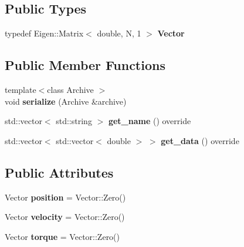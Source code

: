 \subsection*{Public Types}
\begin{DoxyCompactItemize}
\item 
\mbox{\label{structrobot__interfaces_1_1NJointObservation_aa17734049f437f1f2a7fee0009ff91fe}} 
typedef Eigen\+::\+Matrix$<$ double, N, 1 $>$ {\bfseries Vector}
\end{DoxyCompactItemize}
\subsection*{Public Member Functions}
\begin{DoxyCompactItemize}
\item 
\mbox{\label{structrobot__interfaces_1_1NJointObservation_a0c3b4adc3922ac32f11ba5de22d60625}} 
{\footnotesize template$<$class Archive $>$ }\\void {\bfseries serialize} (Archive \&archive)
\item 
\mbox{\label{structrobot__interfaces_1_1NJointObservation_a610b88db60db090f64a03d4a286332be}} 
std\+::vector$<$ std\+::string $>$ {\bfseries get\+\_\+name} () override
\item 
\mbox{\label{structrobot__interfaces_1_1NJointObservation_a5294b6b4e403b79f199dff888984bbf1}} 
std\+::vector$<$ std\+::vector$<$ double $>$ $>$ {\bfseries get\+\_\+data} () override
\end{DoxyCompactItemize}
\subsection*{Public Attributes}
\begin{DoxyCompactItemize}
\item 
\mbox{\label{structrobot__interfaces_1_1NJointObservation_ab7b9151ce91a3b545364cab6163ba86f}} 
Vector {\bfseries position} = Vector\+::\+Zero()
\item 
\mbox{\label{structrobot__interfaces_1_1NJointObservation_a96d7c53ef241b77432105dfa01b36cb0}} 
Vector {\bfseries velocity} = Vector\+::\+Zero()
\item 
\mbox{\label{structrobot__interfaces_1_1NJointObservation_aaef74cc4c90e2dd4b4c6132773c7b262}} 
Vector {\bfseries torque} = Vector\+::\+Zero()
\end{DoxyCompactItemize}

